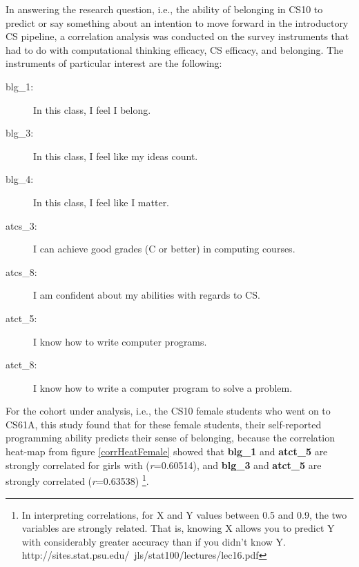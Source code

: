 \documentclass[oneside,titlepage,numbers=noenddot,headinclude,%
               footinclude=true,cleardoublepage=empty,abstractoff,BCOR=2mm,%
               paper=a4,fontsize=11pt,ngerman,american]{scrreprt}
\numberwithin{theorem}{chapter}
\numberwithin{definition}{chapter}
\numberwithin{algorithm}{chapter}
\numberwithin{figure}{chapter}
\numberwithin{table}{chapter}
\numberwithin{equation}{chapter}
\begin{document}
In answering the research question, i.e., the ability of belonging in CS10 to predict or say something about an intention to move forward in the introductory CS pipeline, a correlation analysis was conducted on the survey instruments that had to do with computational thinking efficacy, CS efficacy, and belonging. The instruments of particular interest are the following:
\begin{description} 
\item[blg\_1:] In this class, I feel I belong.
\item[blg\_3:] In this class, I feel like my ideas count.
\item[blg\_4:] In this class, I feel like I matter.
\item[atcs\_3:] I can achieve good grades (C or better) in computing courses.
\item[atcs\_8:] I am confident about my abilities with regards to CS.
\item[atct\_5:] I know how to write computer programs.
\item[atct\_8:] I know how to write a computer program to solve a problem.
\end{description}

For the cohort under analysis, i.e., the CS10 female students who went on to CS61A, this study found that for these female students, their self-reported programming ability predicts their sense of belonging, because the correlation heat-map from figure \ref{corrHeatFemale} showed that \textbf{blg\_1} and \textbf{atct\_5} are strongly correlated for girls with (\emph{r}=0.60514), and \textbf{blg\_3} and \textbf{atct\_5} are strongly correlated (\emph{r}=0.63538) \footnote{%
In interpreting correlations, for X and Y values between 0.5 and 0.9, the two variables are strongly related. That is, knowing X allows you to predict Y with considerably greater accuracy than if you didn't know Y. http://sites.stat.psu.edu/~jls/stat100/lectures/lec16.pdf
}. 
\end{document}
